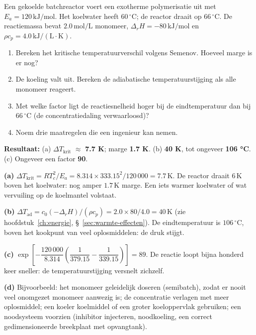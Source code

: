 \begin{oefening}
Een gekoelde batchreactor voert een exotherme polymerisatie uit met \(E_a = 120\,\mathrm{kJ/mol}\). Het koelwater heeft \(60\,^\circ\mathrm{C}\); de reactor draait op \(66\,^\circ\mathrm{C}\). De reactiemassa bevat \(2.0\,\mathrm{mol/L}\) monomeer, \(\Delta_rH = -80\,\mathrm{kJ/mol}\) en \(\rho c_p = 4.0\,\mathrm{kJ/(L\cdot K)}\).

\begin{enumerate}
\item[(a)]
  Bereken het kritische temperatuurverschil volgens Semenov. Hoeveel marge is er nog?
\item[(b)]
  De koeling valt uit. Bereken de adiabatische temperatuurstijging als alle monomeer reageert.
\item[(c)]
  Met welke factor ligt de reactiesnelheid hoger bij de eindtemperatuur dan bij \(66\,^\circ\mathrm{C}\) (de concentratiedaling verwaarloosd)?
\item[(d)]
  Noem drie maatregelen die een ingenieur kan nemen.
\end{enumerate}
\end{oefening}
\begin{oplossing}
\textbf{Resultaat:} (a) \(\Delta T_\mathrm{krit}\) \ensuremath{\approx} \textbf{7.7 K}; marge \textbf{1.7 K}. (b) \textbf{40 K}, tot ongeveer \textbf{106 °C}. (c) Ongeveer een factor \textbf{90}.

\textbf{(a)} \(\Delta T_\mathrm{krit} = RT_c^2/E_a = 8.314 \times 333.15^2/120\,000 = 7.7\,\mathrm{K}\). De reactor draait \(6\,\mathrm{K}\) boven het koelwater: nog amper \(1.7\,\mathrm{K}\) marge. Een iets warmer koelwater of wat vervuiling op de koelmantel volstaat.

\textbf{(b)} \(\Delta T_\mathrm{ad} = c_0(-\Delta_rH)/(\rho c_p) = 2.0 \times 80/4.0 = 40\,\mathrm{K}\) (zie hoofdstuk~\ref{ch:energie}, \S~\ref{sec:warmte-effecten}). De eindtemperatuur is \(106\,^\circ\mathrm{C}\), boven het kookpunt van veel oplosmiddelen: de druk stijgt.

\textbf{(c)} \(\exp\!\left[-\dfrac{120\,000}{8.314}\left(\dfrac{1}{379.15} - \dfrac{1}{339.15}\right)\right] = 89\). De reactie loopt bijna honderd keer sneller: de temperatuurstijging versnelt zichzelf.

\textbf{(d)} Bijvoorbeeld: het monomeer geleidelijk doseren (semibatch), zodat er nooit veel onomgezet monomeer aanwezig is; de concentratie verlagen met meer oplosmiddel; een koeler koelmiddel of een groter koeloppervlak gebruiken; een noodsysteem voorzien (inhibitor injecteren, noodkoeling, een correct gedimensioneerde breekplaat met opvangtank).
\end{oplossing}

